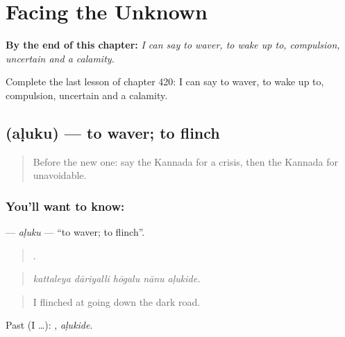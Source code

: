 
\chapter{Facing the Unknown}
\label{ch:ka-facing-the-unknown}

\begin{chapteropening}
\textbf{By the end of this chapter:} \emph{I can say to waver, to wake up to, compulsion, uncertain and a calamity.}

Complete the last lesson of chapter 420: I can say to waver, to wake up to, compulsion, uncertain and a calamity.
\end{chapteropening}

\section[\texorpdfstring{\kn{ಅಳುಕು} (aḷuku)}{ಅಳುಕು (aḷuku)}]{ (aḷuku) — to waver; to flinch}

\label{lesson:KA-C420-aluku}



\begin{quote}
Before the new one: say the Kannada for a crisis, then the Kannada for unavoidable.
\end{quote}

\subsection*{You'll want to know: }
\textbf{} — \emph{aḷuku} — \textquotedblleft{}to waver; to flinch\textquotedblright{}.

\begin{quote}
    .
\end{quote}

\begin{quote}
\emph{kattaleya dāriyalli hōgalu nānu aḷukide.}
\end{quote}

\begin{quote}
I flinched at going down the dark road.
\end{quote}

Past (I …): , \emph{aḷukide}.

